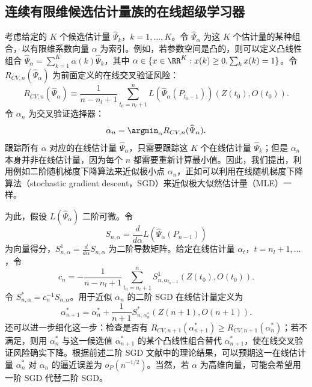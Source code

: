 \subsection{连续有限维候选估计量族的在线超级学习器}

考虑给定的 $K$ 个候选估计量 $\widehat\Psi_k$，$k=1,\ldots,K$。令 $\widehat\Psi_\alpha$ 为这 $K$ 个估计量的某种组合，以有限维系数向量 $\alpha$ 为索引。例如，若参数空间是凸的，则可以定义凸线性组合 $\widehat\Psi_\alpha=\sum_{k=1}^K\alpha(k)\widehat\Psi_k$，其中 $\alpha\in\{x\in\RR^K:x(k)\ge0,\sum_kx(k)=1\}$。令 $R_{CV,n}(\widehat\Psi_\alpha)$ 为前面定义的在线交叉验证风险：
\[
 R_{CV,n}(\widehat\Psi_\alpha)
 \equiv\frac{1}{n-n_l+1}\sum_{t_0=n_l+1}^{n}
 L(\widehat\Psi_\alpha(P_{t_0-1}))(Z(t_0),O(t_0)).
\]
令 $\alpha_n$ 为交叉验证选择器：
\[
 \alpha_n=\argmin_\alpha R_{CV,n}(\widehat\Psi_\alpha).
\]
跟踪所有 $\alpha$ 对应的在线估计量 $\widehat\Psi_\alpha$，只需要跟踪这 $K$ 个在线估计量 $\widehat\Psi_k$；但是 $\alpha_n$ 本身并非在线估计量，因为每个 $n$ 都需要重新计算最小值。因此，我们提出，利用例如二阶随机梯度下降算法来近似极小点 $\alpha_n$，正如可以利用在线随机梯度下降算法（stochastic gradient descent，SGD）来近似极大似然估计量（MLE）一样。

为此，假设 $L(\widehat\Psi_\alpha)$ 二阶可微。令
\[
 S_{n,\alpha}=\frac{d}{d\alpha}L(\widehat\Psi_\alpha(P_{n-1}))
\]
为向量得分，$S^1_{n,\alpha}=\frac{d}{d\alpha}S_{n,\alpha}$ 为二阶导数矩阵。给定在线估计量 $\alpha_t$，$t=n_l+1,\ldots$，令
\[
 c_n=-\frac{1}{n-n_l+1}\sum_{t_0=n_l+1}^{n}
 S^1_{n,\alpha_{t_0-1}}(Z(t_0),O(t_0)).
\]
令 $S^*_{n,\alpha}=c_n^{-1}S_{n,\alpha}$。用于近似 $\alpha_n$ 的二阶 SGD 在线估计量定义为
\[
 \alpha^*_{n+1}=\alpha^*_n+\frac{1}{n+1}
 S^*_{n,\alpha_n^*}(Z(n+1),O(n+1)).
\]
还可以进一步细化这一步：检查是否有 $R_{CV,n+1}(\alpha^*_{n+1})\ge R_{CV,n+1}(\alpha^*_n)$；若不满足，则用 $\alpha^*_n$ 与这一候选值 $\alpha^*_{n+1}$ 的某个凸线性组合替代 $\alpha^*_{n+1}$，使在线交叉验证风险确实下降。根据前述二阶 SGD 文献中的理论结果，可以预期这一在线估计量 $\alpha^*_n$ 对 $\alpha_n$ 的逼近误差为 $o_P(n^{-1/2})$。当然，若 $\alpha$ 为高维向量，可能会希望用一阶 SGD 代替二阶 SGD。
